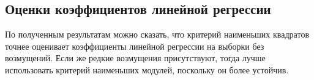 \subsection{Оценки коэффициентов линейной регрессии}
\noindent По полученным результатам можно сказать, что критерий наименьших квадратов точнее оценивает коэффициенты линейной регрессии на выборки без возмущений. Если же редкие возмущения присутствуют, тогда лучше использовать критерий наименьших модулей, поскольку он более устойчив.
